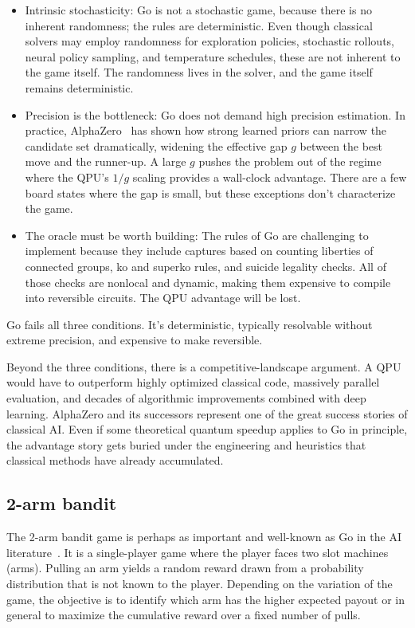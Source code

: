 \begin{itemize}
  \item Intrinsic stochasticity: Go is not a stochastic game, because there is no inherent randomness; the rules are deterministic. Even though classical solvers may employ randomness for exploration policies, stochastic rollouts, neural policy sampling, and temperature schedules, these are not inherent to the game itself. The randomness lives in the solver, and the game itself remains deterministic.
  \item Precision is the bottleneck: Go does not demand high precision estimation. In practice, AlphaZero~\cite{silver2017,silver2018} has shown how strong learned priors can narrow the candidate set dramatically, widening the effective gap $g$ between the best move and the runner-up. A large $g$ pushes the problem out of the regime where the QPU's $1/g$ scaling provides a wall-clock advantage. There are a few board states where the gap is small, but these exceptions don't characterize the game.
  \item The oracle must be worth building: The rules of Go are challenging to implement because they include captures based on counting liberties of connected groups, ko and superko rules, and suicide legality checks. All of those checks are nonlocal and dynamic, making them expensive to compile into reversible circuits. The QPU advantage will be lost.
\end{itemize}

Go fails all three conditions.
It's deterministic, typically resolvable without extreme precision, and expensive to make reversible.

Beyond the three conditions, there is a competitive-landscape argument.
A QPU would have to outperform highly optimized classical code, massively parallel evaluation, and decades of algorithmic improvements combined with deep learning.
AlphaZero and its successors represent one of the great success stories of classical AI.
Even if some theoretical quantum speedup applies to Go in principle, the advantage story gets buried under the engineering and heuristics that classical methods have already accumulated.

\subsection{2-arm bandit}

The 2-arm bandit game is perhaps as important and well-known as Go in the AI literature~\cite{sutton2018}.
It is a single-player game where the player faces two slot machines (arms).
Pulling an arm yields a random reward drawn from a probability distribution that is not known to the player.
Depending on the variation of the game, the objective is to identify which arm has the higher expected payout or in general to maximize the cumulative reward over a fixed number of pulls.

